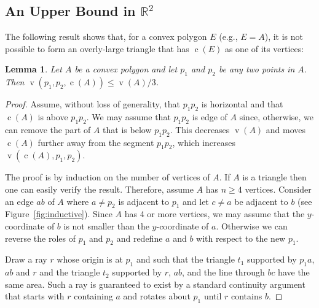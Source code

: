 \documentclass[preprint, 12pt]{elsarticle}
\newtheorem{lem}{Lemma}
\DeclareMathOperator{\vol}{v}
\DeclareMathOperator{\cog}{c}
\begin{document}
\subsection{An Upper Bound in $\mathbb{R}^{2}$}
\label{sec:2dbound}

The following result shows that, for a convex polygon $E$ (e.g., $E=A$),
it is not possible to form an overly-large triangle that has $\cog(E)$
as one of its vertices:

\begin{lem}
  \label{lem:2dgrav}
  Let $A$ be a convex polygon and let $p_{1}$ and $p_{2}$ be any two points in $A$. Then $\vol(p_{1},p_{2},\cog(A)) \leq \vol(A)/3$.
\end{lem}
\begin{proof}
Assume, without loss of generality, that $p_1p_2$ is horizontal and that
$\cog(A)$ is above $p_1p_2$.  We may assume that $p_1p_2$ is edge of $A$
since, otherwise, we can remove the part of $A$ that is below $p_1p_2$.
This decreases $\vol(A)$ and moves $\cog(A)$ further away from the segment $p_1p_2$, which increases $\vol(\cog(A),p_1,p_2)$.

The proof is by induction on the number of vertices of $A$.  If $A$
is a triangle then one can easily verify the result.  Therefore,
assume $A$ has $n\ge 4$ vertices.  Consider an edge $ab$ of $A$ where
$a\neq p_2$ is adjacent to $p_1$ and let $c\neq a$ be adjacent to $b$
(see Figure~\ref{fig:inductive}).  Since $A$ has 4 or more vertices,
we may assume that the $y$-coordinate of $b$ is not smaller than the
$y$-coordinate of $a$. Otherwise we can reverse the roles of $p_1$
and $p_2$ and redefine $a$ and $b$ with respect to the new $p_1$.

Draw a ray $r$ whose origin is at $p_1$ and such that the triangle $t_1$
supported by $p_1a$, $ab$ and $r$ and the triangle $t_2$ supported by
$r$, $ab$, and the line through $bc$ have the same area.  Such a ray is
guaranteed to exist by a standard continuity argument that starts with
$r$ containing $a$ and rotates about $p_1$ until $r$ contains $b$.


\end{proof}
\end{document}
